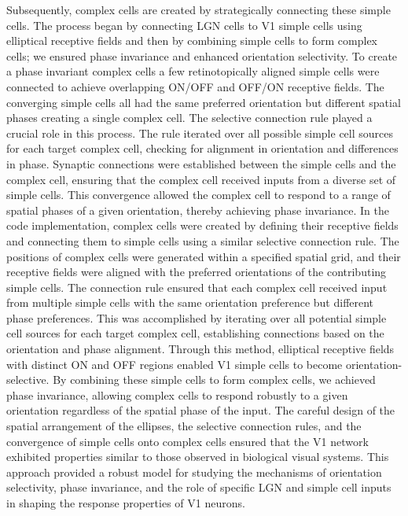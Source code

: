 \documentclass[12pt]{article}
\begin{document}
Subsequently, complex cells are created by strategically connecting these simple cells. The process began by connecting LGN cells to V1 simple cells using elliptical receptive fields and then by combining simple cells to form complex cells; we ensured phase invariance and enhanced orientation selectivity. To create a phase invariant complex cells a few retinotopically aligned simple cells were connected to achieve overlapping ON/OFF and OFF/ON receptive fields. The converging simple cells all had the same preferred orientation but different spatial phases creating a single complex cell. The selective connection rule played a crucial role in this process. The rule iterated over all possible simple cell sources for each target complex cell, checking for alignment in orientation and differences in phase. Synaptic connections were established between the simple cells and the complex cell, ensuring that the complex cell received inputs from a diverse set of simple cells. This convergence allowed the complex cell to respond to a range of spatial phases of a given orientation, thereby achieving phase invariance.
\bigbreak
In the code implementation, complex cells were created by defining their receptive fields and connecting them to simple cells using a similar selective connection rule. The positions of complex cells were generated within a specified spatial grid, and their receptive fields were aligned with the preferred orientations of the contributing simple cells. The connection rule ensured that each complex cell received input from multiple simple cells with the same orientation preference but different phase preferences. This was accomplished by iterating over all potential simple cell sources for each target complex cell, establishing connections based on the orientation and phase alignment. Through this method, elliptical receptive fields with distinct ON and OFF regions enabled V1 simple cells to become orientation-selective. By combining these simple cells to form complex cells, we achieved phase invariance, allowing complex cells to respond robustly to a given orientation regardless of the spatial phase of the input. The careful design of the spatial arrangement of the ellipses, the selective connection rules, and the convergence of simple cells onto complex cells ensured that the V1 network exhibited properties similar to those observed in biological visual systems. This approach provided a robust model for studying the mechanisms of orientation selectivity, phase invariance, and the role of specific LGN and simple cell inputs in shaping the response properties of V1 neurons.
\end{document}
